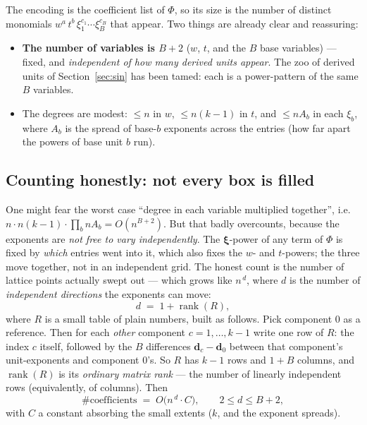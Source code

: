 \documentclass[11pt,a4paper]{article}
\theoremstyle{definition}
\theoremstyle{plain}
\newcommand{\bvec}[1]{\mathbf{#1}}
\begin{document}
The encoding is the coefficient list of $\Phi$, so its size is the number of
distinct monomials $w^a\,t^b\,\xi_1^{c_1}\cdots\xi_B^{c_B}$ that appear. Two things
are already clear and reassuring:
\begin{itemize}[leftmargin=*]
\item \textbf{The number of variables is $B+2$} ($w$, $t$, and the $B$ base
      variables) --- fixed, and \emph{independent of how many derived units appear}.
      The zoo of derived units of Section~\ref{sec:sin} has been tamed: each is a
      power-pattern of the same $B$ variables.
\item The degrees are modest: $\le n$ in $w$, $\le n(k-1)$ in $t$, and $\le nA_b$
      in each $\xi_b$, where $A_b$ is the spread of base-$b$ exponents across the
      entries (how far apart the powers of base unit $b$ run).
\end{itemize}

\subsection{Counting honestly: not every box is filled}

One might fear the worst case ``degree in each variable multiplied together'',
i.e.\ $n\cdot n(k-1)\cdot\prod_b nA_b=O(n^{B+2})$. But that badly overcounts,
because the exponents are \emph{not free to vary independently}. The
$\boldsymbol\xi$-power of any term of $\Phi$ is fixed by \emph{which} entries went
into it, which also fixes the $w$- and $t$-powers; the three move together, not in
an independent grid. The honest count is the number of lattice points actually
swept out --- which grows like $n^{\,d}$, where $d$ is the number of
\emph{independent directions} the exponents can move:
\begin{equation}\label{eq:dim}
   d\;=\;1+\operatorname{rank}(R),
\end{equation}
where $R$ is a small table of plain numbers, built as follows. Pick component $0$
as a reference. Then for each \emph{other} component $c=1,\dots,k-1$ write one row
of $R$: the index $c$ itself, followed by the $B$ differences
$\bvec d_c-\bvec d_0$ between that component's unit-exponents and component $0$'s. So
$R$ has $k-1$ rows and $1+B$ columns, and $\operatorname{rank}(R)$ is its
\emph{ordinary matrix rank} --- the number of linearly independent rows (equivalently,
of columns). Then
\[
   \#\text{coefficients}\;=\;O\!\bigl(n^{\,d}\cdot C\bigr),\qquad 2\le d\le B+2,
\]
with $C$ a constant absorbing the small extents ($k$, and the exponent spreads).
\end{document}
